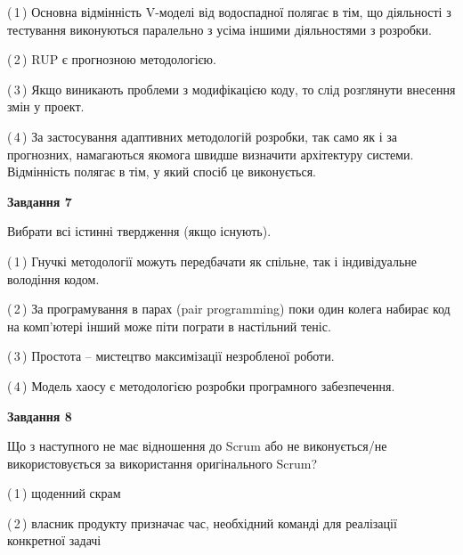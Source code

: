 \documentclass[10pt, ukrainian]{article}
\begin{document}
{\begin {large}
(\,1\,) Основна відмінність V-моделі від водоспадної полягає в тім, що діяльності з тестування виконуються паралельно з усіма іншими діяльностями з розробки. %



(\,2\,) RUP є прогнозною методологією. %



(\,3\,) Якщо виникають проблеми з модифікацією коду, то слід розглянути внесення змін у проект. %



(\,4\,) За застосування адаптивних методологій розробки, так само як і за прогнозних, намагаються якомога швидше визначити архітектуру системи. Відмінність полягає в тім, у який спосіб це виконується.%


{\begin {center}\textbf{Завдання 7}\end {center}}\par
Вибрати всі істинні твердження (якщо існують).\par
\vspace{2mm}



(\,1\,) Гнучкі методології можуть передбачати як спільне, так і індивідуальне володіння кодом. %



(\,2\,) За програмування в парах (pair programming) поки один колега набирає код на комп'ютері інший може піти пограти в настільний теніс. %



(\,3\,) Простота – мистецтво максимізації незробленої роботи. %



(\,4\,) Модель хаосу є методологією розробки програмного забезпечення. %


{\begin {center}\textbf{Завдання 8}\end {center}}\par
Що з наступного не має відношення до Scrum або не виконується/не використовується за використання оригінального Scrum?\par
\vspace{2mm}



(\,1\,) щоденний скрам%



(\,2\,) власник продукту призначає час, необхідний команді для реалізації конкретної задачі%




\end{large}}
\end{document}
